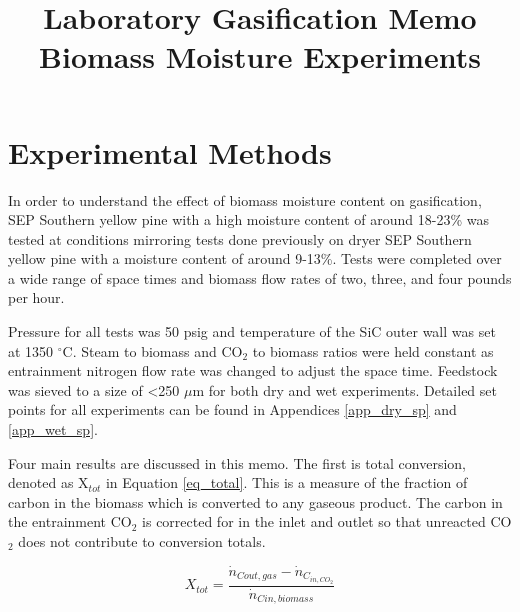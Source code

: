 \documentclass[11pt,twocolumn]{article}
\date{}
\title{Laboratory Gasification Memo\\Biomass Moisture Experiments \vspace{-6ex}}
\begin{document}

\section*{Experimental Methods}

In order to understand the effect of biomass moisture content on gasification, SEP Southern yellow pine with a high moisture content of around 18-23\% was tested at conditions mirroring tests done previously on dryer SEP Southern yellow pine with a moisture content of around 9-13\%.  Tests were completed over a wide range of space times and biomass flow rates of two, three, and four pounds per hour.

Pressure for all tests was 50 psig and temperature of the SiC outer wall was set at 1350 $^\circ$C.  Steam to biomass and CO$_2$ to biomass ratios were held constant as entrainment nitrogen flow rate was changed to adjust the space time.  Feedstock was sieved to a size of \textless 250 $\mu$m for both dry and wet experiments.  Detailed set points for all experiments can be found in Appendices \ref{app_dry_sp} and \ref{app_wet_sp}.

Four main results are discussed in this memo.  The first is total conversion, denoted as X$_{tot}$ in Equation \ref{eq_total}. This is a measure of the fraction of carbon in the biomass which is converted to any gaseous product. The carbon in the entrainment CO$_2$ is corrected for in the inlet and outlet so that unreacted CO$_2$ does not contribute to conversion totals.

\begin{equation}
	X_{tot} = \frac{\dot{n}_{C out,gas} - \dot{n}_{C_{in,CO_2}}}{\dot{n}_{C in,biomass}}
	\label{eq_total}
\end{equation}
\end{document}
